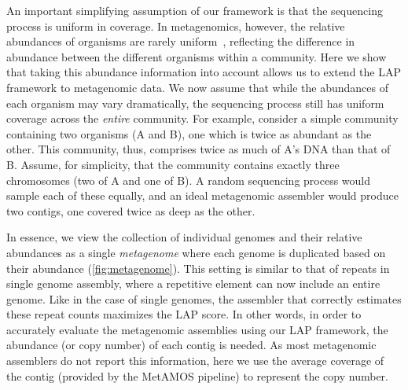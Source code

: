 An important simplifying assumption of our framework is that the sequencing process is uniform in coverage.
In metagenomics, however, the relative abundances of organisms are rarely uniform~\cite{carrigg2007dna,krsek1999comparison,morgan2010metagenomic,temperton2009bias}, reflecting the difference in abundance between the different organisms within a community.
Here we show that taking this abundance information into account allows us to extend the LAP framework to metagenomic data.
We now assume that while the abundances of each organism may vary dramatically, the sequencing process still has uniform coverage across the \emph{entire} community.
For example, consider a simple community containing two organisms (A and B), one which is twice as abundant as the other.
This community, thus, comprises twice as much of A's DNA than that of B.
Assume, for simplicity, that the community contains exactly three chromosomes (two of A and one of B).
A random sequencing process would sample each of these equally, and an ideal metagenomic assembler would produce two contigs, one covered twice as deep as the other.



In essence, we view the collection of individual genomes and their relative abundances as a single \emph{metagenome} where each genome is duplicated based on their abundance (\figurename \ref{fig:metagenome}).
This setting is similar to that of repeats in single genome assembly, where a repetitive element can now include an entire genome.
Like in the case of single genomes, the assembler that correctly estimates these repeat counts maximizes the LAP score.
In other words, in order to accurately evaluate the metagenomic assemblies using our LAP framework, the abundance (or copy number) of each contig is needed.
As most metagenomic assemblers do not report this information,
here we use the average coverage of the contig (provided by the MetAMOS pipeline) to represent the copy number.

